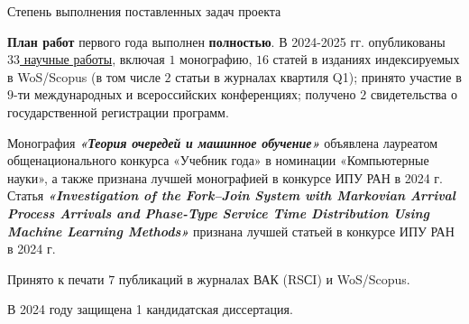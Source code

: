 \documentclass[10pt]{beamer}
\begin{document}
\begin{frame}{Степень выполнения поставленных задач проекта}
\justifying

{\bf План работ} первого года выполнен {\bf полностью}. В 2024-2025 гг. опубликованы  \underline{$33$ научные работы}, включая $1$ монографию, $16$ статей в изданиях индексируемых в WoS/Scopus (в том числе $2$ статьи в журналах квартиля Q1); принято участие в $9$-ти международных и всероссийских конференциях; получено $2$ свидетельства о государственной регистрации программ. 

\bigskip

Монография \textbf{\textit{«Теория очередей и машинное обучение»}} объявлена лауреатом общенационального конкурса «Учебник года»  в номинации «Компьютерные науки», а также признана лучшей монографией в конкурсе ИПУ РАН в 2024 г. Статья \textbf{\textit{ «Investigation of the Fork–Join System with Markovian Arrival Process Arrivals and Phase-Type Service Time Distribution Using Machine Learning Methods» }}
признана лучшей статьей в конкурсе ИПУ РАН в 2024 г.

\bigskip

Принято к печати $7$ публикаций в журналах ВАК (RSСI) и WoS/Scopus.

\smallskip
В 2024 году защищена 1 кандидатская диссертация.

\end{frame}
\end{document}
